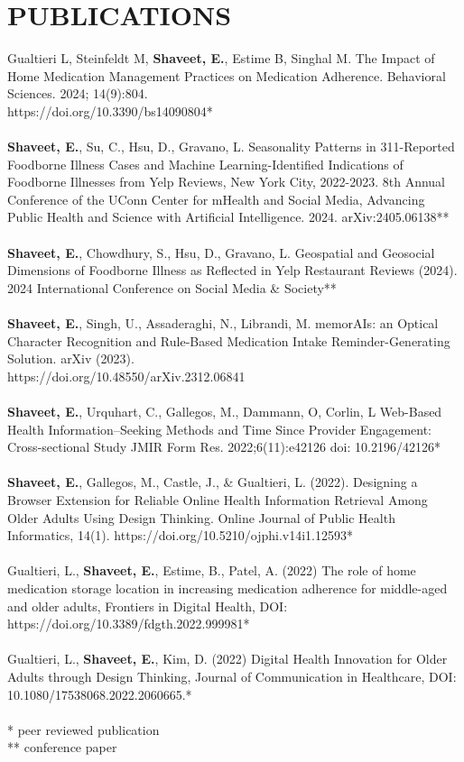 \documentclass[a4paper,12pt]{article}
\begin{document}
{\section*{PUBLICATIONS}
Gualtieri L, Steinfeldt M, \textbf{Shaveet, E.}, Estime B, Singhal M. The Impact of Home Medication Management Practices on Medication Adherence. Behavioral Sciences. 2024; 14(9):804.\\ https://doi.org/10.3390/bs14090804*\\
\\
\textbf{Shaveet, E.}, Su, C., Hsu, D., Gravano, L. Seasonality Patterns in 311-Reported Foodborne Illness Cases and Machine Learning-Identified Indications of Foodborne Illnesses from Yelp Reviews, New York City, 2022-2023. 8th Annual Conference of the UConn Center for mHealth and Social Media, Advancing Public Health and Science with Artificial Intelligence. 2024. arXiv:2405.06138**\\
\\
\textbf{Shaveet, E.}, Chowdhury, S., Hsu, D., Gravano, L. Geospatial and Geosocial Dimensions of Foodborne Illness as Reflected in Yelp Restaurant Reviews (2024). 2024 International Conference on Social Media \& Society**\\
\pagebreak 
\\
\textbf{Shaveet, E.}, Singh, U., Assaderaghi, N., Librandi, M. memorAIs: an Optical Character Recognition and Rule-Based Medication Intake Reminder-Generating Solution. arXiv (2023). \\https://doi.org/10.48550/arXiv.2312.06841\\
\\
\textbf{Shaveet, E.}, Urquhart, C., Gallegos, M., Dammann, O, Corlin, L Web-Based Health Information–Seeking Methods and Time Since Provider Engagement: Cross-sectional Study JMIR Form Res. 2022;6(11):e42126 doi: 10.2196/42126*\\
\\
\textbf{Shaveet, E.}, Gallegos, M., Castle, J., \& Gualtieri, L. (2022). Designing a Browser Extension for Reliable Online Health Information Retrieval Among Older Adults Using Design Thinking. Online Journal of Public Health Informatics, 14(1). https://doi.org/10.5210/ojphi.v14i1.12593*\\
\\
Gualtieri, L., \textbf{Shaveet, E.}, Estime, B., Patel, A. (2022) The role of home medication storage location in increasing medication adherence for middle-aged and older adults, Frontiers in Digital Health, DOI: https://doi.org/10.3389/fdgth.2022.999981*\\
\\
Gualtieri, L., \textbf{Shaveet, E.}, Kim, D. (2022) Digital Health Innovation for Older Adults through Design Thinking, Journal of Communication in Healthcare, DOI: 10.1080/17538068.2022.2060665.*\\
\\
\footnotesize{* peer reviewed publication}\\
\footnotesize{** conference paper}\\
}
\end{document}

